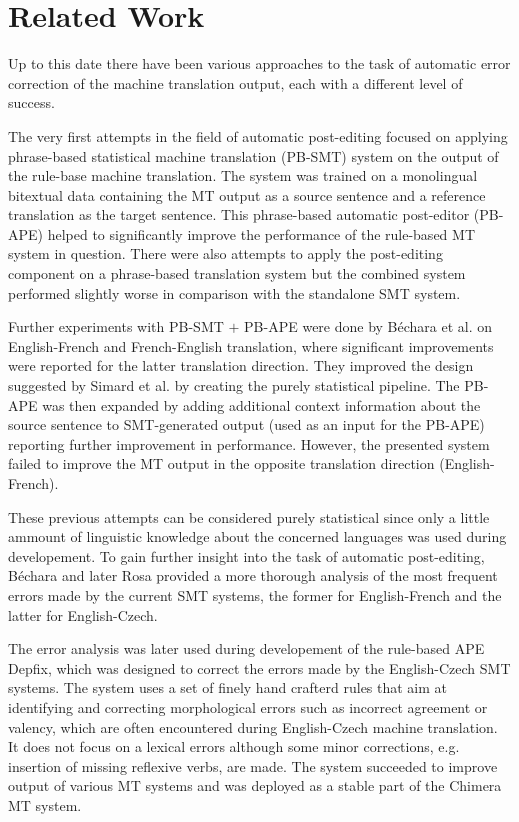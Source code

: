 \section{Related Work}

Up to this date there have been various approaches to the task of automatic
error correction of the machine translation output, each with a different level of success.

The very first attempts in the field of automatic post-editing\cite{simard2007rule}
focused on applying phrase-based statistical machine translation (PB-SMT)
system on the output of the rule-base machine translation. The system was trained on a monolingual
bitextual data containing the MT output as a source sentence and a reference translation as
the target sentence. This phrase-based automatic post-editor (PB-APE) helped to significantly improve
the performance of the rule-based MT system in question.
There were also attempts to apply the post-editing component
on a phrase-based translation system but the combined system performed slightly worse in comparison
with the standalone SMT system.

Further experiments with PB-SMT $+$ PB-APE were done by B\'{e}chara et al.\cite{bechara:2011}
on English-French and French-English translation, where significant improvements were reported
for the latter translation direction. They improved the design suggested by Simard et al. by
creating the purely statistical pipeline. The PB-APE was then expanded by adding additional
context information about the source sentence to SMT-generated output (used as an input for
the PB-APE) reporting further improvement in performance. However, the presented system failed to
improve the MT output in the opposite translation direction (English-French).

These previous attempts can be considered purely statistical since only a little ammount of linguistic
knowledge about the concerned languages was used during developement. To gain further insight into
the task of automatic post-editing, B\'{e}chara\cite{bechara:master} and later Rosa\cite{biblio:RoAutomaticpostediting2013} provided
a more thorough analysis of the most frequent errors made by the current SMT systems, the former
for English-French and the latter for English-Czech.

The error analysis was later used during developement of the rule-based APE Depfix\cite{depfix:2014},
which was designed to correct the errors made by the English-Czech SMT systems.
The system uses a set of finely hand crafterd rules that aim at identifying
and correcting morphological errors such as incorrect agreement or valency, which are
often encountered during English-Czech machine translation. It does not focus on a lexical errors
although some minor corrections, e.g. insertion of missing reflexive verbs, are made. The system
succeeded to improve output of various MT systems and was deployed as a stable part of the
Chimera\cite{biblio:BoRoChimera2013} MT system.

